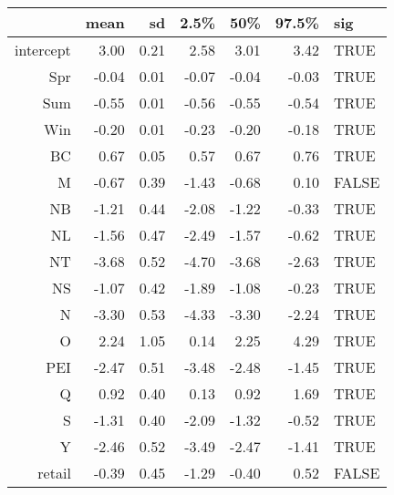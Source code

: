 \begin{table}[ht]
\centering
\begin{tabular}{rrrrrrl}
  \hline
 & mean & sd & 2.5\% & 50\% & 97.5\% & sig \\ 
  \hline
intercept & 3.00 & 0.21 & 2.58 & 3.01 & 3.42 & TRUE \\ 
  Spr & -0.04 & 0.01 & -0.07 & -0.04 & -0.03 & TRUE \\ 
  Sum & -0.55 & 0.01 & -0.56 & -0.55 & -0.54 & TRUE \\ 
  Win & -0.20 & 0.01 & -0.23 & -0.20 & -0.18 & TRUE \\ 
  BC & 0.67 & 0.05 & 0.57 & 0.67 & 0.76 & TRUE \\ 
  M & -0.67 & 0.39 & -1.43 & -0.68 & 0.10 & FALSE \\ 
  NB & -1.21 & 0.44 & -2.08 & -1.22 & -0.33 & TRUE \\ 
  NL & -1.56 & 0.47 & -2.49 & -1.57 & -0.62 & TRUE \\ 
  NT & -3.68 & 0.52 & -4.70 & -3.68 & -2.63 & TRUE \\ 
  NS & -1.07 & 0.42 & -1.89 & -1.08 & -0.23 & TRUE \\ 
  N & -3.30 & 0.53 & -4.33 & -3.30 & -2.24 & TRUE \\ 
  O & 2.24 & 1.05 & 0.14 & 2.25 & 4.29 & TRUE \\ 
  PEI & -2.47 & 0.51 & -3.48 & -2.48 & -1.45 & TRUE \\ 
  Q & 0.92 & 0.40 & 0.13 & 0.92 & 1.69 & TRUE \\ 
  S & -1.31 & 0.40 & -2.09 & -1.32 & -0.52 & TRUE \\ 
  Y & -2.46 & 0.52 & -3.49 & -2.47 & -1.41 & TRUE \\ 
  retail & -0.39 & 0.45 & -1.29 & -0.40 & 0.52 & FALSE \\ 
   \hline
\end{tabular}
\end{table}
